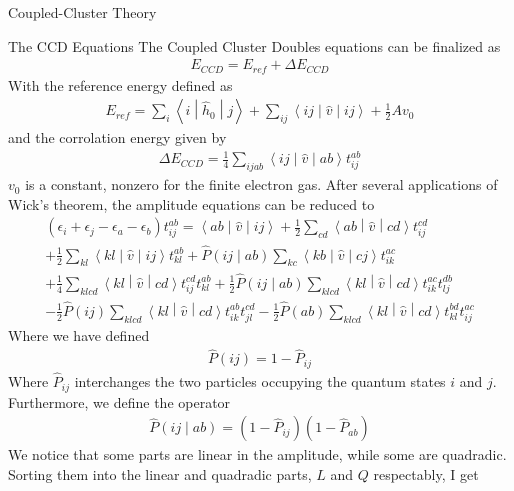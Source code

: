 \documentclass[twoside,english]{uiofysmaster}
\begin{document}
\begin{chapter}{Coupled-Cluster Theory}
  	\begin{section}{The CCD Equations}
  		The Coupled Cluster Doubles equations can be finalized as
  		\begin{align}
  			E_{CCD} = E_{ref} + \Delta E_{CCD} 
  		\end{align}
  		With the reference energy defined as 
  		\begin{align}
  			E_{ref} = \sum_i \left< i \middle| \hat h_0 \middle| j\right> + \sum_{ij} \left<ij\middle|\hat v\middle|ij\right> + \frac{1}{2}Av_0
  		\end{align}
  		and the corrolation energy given by
  		\begin{align}
  			\Delta E_{CCD} = \frac{1}{4} \sum_{ijab}\left<ij\middle|\hat v\middle|ab\right> t_{ij}^{ab}
  		\end{align}
  		$v_0$ is a constant, nonzero for the finite electron gas. After several applications of Wick's theorem, the amplitude equations can be reduced to
  		\begin{align}
  			(\epsilon_i + \epsilon_j - \epsilon_a - \epsilon_b) t_{ij}^{ab} = \left<ab\middle|\hat v\middle|ij\right> + \frac{1}{2} \sum_{cd}\left<ab\middle|\hat v\middle|cd\right>t_{ij}^{cd} \\
  			+ \frac{1}{2} \sum_{kl} \left<kl\middle|\hat v\middle|ij\right>t_{kl}^{ab} + \hat P\left(ij\middle|ab\right) \sum_{kc}\left<kb\middle|\hat v\middle|cj\right>t_{ik}^{ac} \\
  			+ \frac{1}{4} \sum_{klcd}\left<kl\middle|\hat v\middle|cd\right>t_{ij}^{cd} t_{kl}^{ab} + \frac{1}{2} \hat P\left(ij\middle|ab\right) \sum_{klcd}\left<kl\middle|\hat v\middle|cd\right>t_{ik}^{ac} t_{lj}^{db}\\
  			- \frac{1}{2}\hat P(ij) \sum_{klcd}\left<kl\middle|\hat v\middle|cd\right>t_{ik}^{ab} t_{jl}^{cd} - \frac{1}{2}\hat P(ab) \sum_{klcd}\left<kl\middle|\hat v\middle|cd\right>t_{kl}^{bd} t_{ij}^{ac}
  			\label{CCD_equations1}
  		\end{align}
  		Where we have defined
  		\begin{align}
  			\hat P(ij) = 1 - \hat P_{ij}
  		\end{align}
  		Where $\hat P_{ij}$ interchanges the two particles occupying the quantum states $i$ and $j$. Furthermore, we define the operator 
  		\begin{align}
  			\hat P\left( ij \middle| ab \right) = (1 - \hat P_{ij}) (1 - \hat P_{ab})
  		\end{align}
  		We notice that some parts are linear in the amplitude, while some are quadradic. Sorting them into the linear and quadradic parts, $L$ and $Q$ respectably, I get

\end{section}
\end{chapter}
\end{document}

